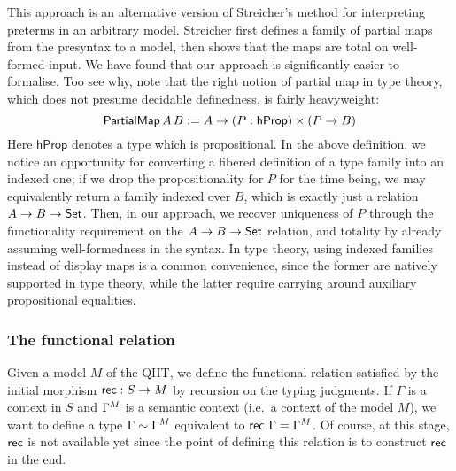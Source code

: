 This approach is an alternative version of Streicher's method for interpreting
preterms in an arbitrary model\cite{streichersemantics}. Streicher first defines
a family of partial maps from the presyntax to a model, then shows that the maps
are total on well-formed input. We have found that our approach is significantly
easier to formalise. Too see why, note that the right notion of partial map in
type theory, which does not presume decidable definedness, is fairly
heavyweight:
\[
  \mathsf{PartialMap}\,A\,B := A\rightarrow (P : \mathsf{hProp})\times(P \rightarrow B)
\]
Here $\mathsf{hProp}$ denotes a type which is propositional. In the above
definition, we notice an opportunity for converting a fibered definition of a
type family into an indexed one; if we drop the propositionality for $P$ for the
time being, we may equivalently return a family indexed over $B$, which is
exactly just a relation $A\rightarrow B\rightarrow\mathsf{Set}$. Then, in our approach, we recover
uniqueness of $P$ through the functionality requirement on the $A\rightarrow B\rightarrow\mathsf{Set}$
relation, and totality by already assuming well-formedness in the syntax. In type
theory, using indexed families instead of display maps is a common convenience,
since the former are natively supported in type theory, while the latter require
carrying around auxiliary propositional equalities.

\subsubsection{The functional relation}

Given a model $M$ of the QIIT, we define the functional relation satisfied by
the initial morphism $\mathsf{rec} : S\to M$ by recursion on the typing judgments.
If $\Gamma$ is a context in $S$ and ${\Gamma}^M$ is a semantic context
(i.e.\ a context of the model $M$), we want to define a type
$\Gamma\sim {\Gamma}^M$ equivalent to $\mathsf{rec}\,\,\Gamma={\Gamma}^M$. Of
course, at this stage, $\mathsf{rec}$ is not available yet since the point of
defining this relation is to construct $\mathsf{rec}$ in the end.

